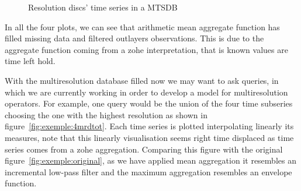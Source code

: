 \begin{figure}[tp]
  \centering
  
  \caption{Resolution discs' time series in a MTSDB}
  \label{fig:exemple:4mrd}
\end{figure}


In all the four plots, we can see that arithmetic mean aggregate
function has filled missing data and filtered outlayers
observations. This is due to the aggregate function coming from a zohe
interpretation, that is known values are time left hold. 




%   



With the multiresolution database filled now we may want to ask
queries, in which we are currently working in order to develop a model
for multiresolution operators.  For example, one query would be the
union of the four time subseries choosing the one with the highest
resolution as shown in figure~\ref{fig:exemple:4mrdtot}.  
Each time series is plotted interpolating linearly its measures, note
that this linearly visualisation seems right time displaced as time
series comes from a zohe aggregation.  Comparing this figure with the
original figure~\ref{fig:exemple:original}, as we have applied mean
aggregation it resembles an incremental low-pass filter and the
maximum aggregation resembles an envelope function.

